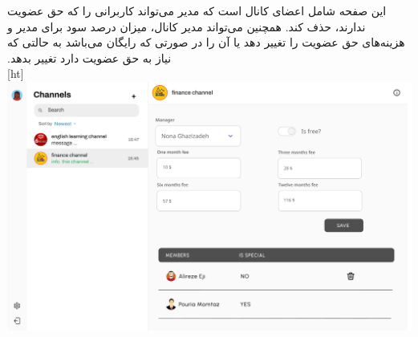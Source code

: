 ‫
‫
‫این صفحه شامل اعضای کانال است که مدیر می‌تواند کاربرانی را که حق عضویت ندارند، حذف کند. همچنین می‌تواند مدیر کانال، میزان درصد سود برای مدیر و هزینه‌های حق عضویت را تغییر دهد یا آن را در صورتی که رایگان می‌باشد به حالتی که نیاز به حق عضویت دارد تغییر بدهد.
‫\\
‫[ht]
\includegraphics[scale=0.2]{figs/info_admin_channel_page.jpeg}
‫
‫
‫
‫\FloatBarrier
\clearpage

